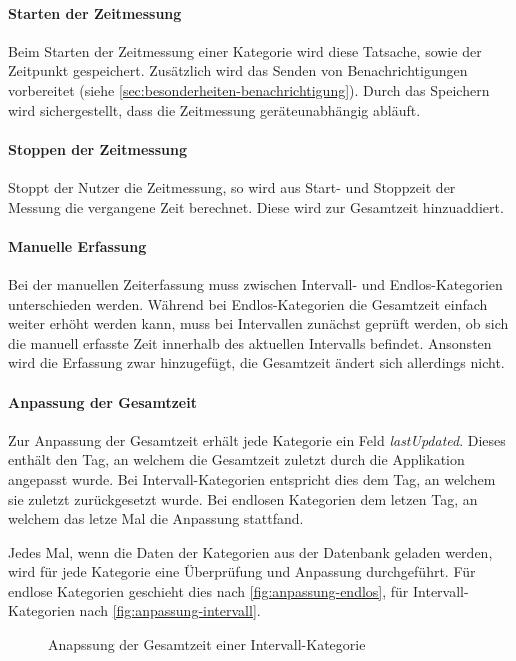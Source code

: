 \paragraph{Starten der Zeitmessung}
Beim Starten der Zeitmessung einer Kategorie wird diese Tatsache,
sowie der Zeitpunkt gespeichert.
Zusätzlich wird das Senden von Benachrichtigungen vorbereitet (siehe \autoref{sec:besonderheiten-benachrichtigung}).
Durch das Speichern wird sichergestellt, dass die Zeitmessung geräteunabhängig abläuft.

\paragraph{Stoppen der Zeitmessung}
Stoppt der Nutzer die Zeitmessung,
so wird aus Start- und Stoppzeit der Messung die vergangene Zeit berechnet.
Diese wird zur Gesamtzeit hinzuaddiert.

\paragraph{Manuelle Erfassung}
Bei der manuellen Zeiterfassung muss zwischen Intervall- und Endlos-Kategorien unterschieden werden.
Während bei Endlos-Kategorien die Gesamtzeit einfach weiter erhöht werden kann,
muss bei Intervallen zunächst geprüft werden,
ob sich die manuell erfasste Zeit innerhalb des aktuellen Intervalls befindet.
Ansonsten wird die Erfassung zwar hinzugefügt,
die Gesamtzeit ändert sich allerdings nicht.

\paragraph{Anpassung der Gesamtzeit}
Zur Anpassung der Gesamtzeit erhält jede Kategorie ein Feld \emph{lastUpdated}.
Dieses enthält den Tag, an welchem die Gesamtzeit zuletzt durch die Applikation angepasst wurde.
Bei Intervall-Kategorien entspricht dies dem Tag, an welchem sie zuletzt zurückgesetzt wurde.
Bei endlosen Kategorien dem letzen Tag, an welchem das letze Mal die Anpassung stattfand.

Jedes Mal, wenn die Daten der Kategorien aus der Datenbank geladen werden,
wird für jede Kategorie eine Überprüfung und Anpassung durchgeführt.
Für endlose Kategorien geschieht dies nach \autoref{fig:anpassung-endlos},
für Intervall-Kategorien nach \autoref{fig:anpassung-intervall}.
\begin{figure}[ht!]
    \centering
    \resizebox{0.5\textwidth}{!}{
        
    }
	\caption{Anapssung der Gesamtzeit einer Intervall-Kategorie}
    \label{fig:anpassung-intervall}
\end{figure}

